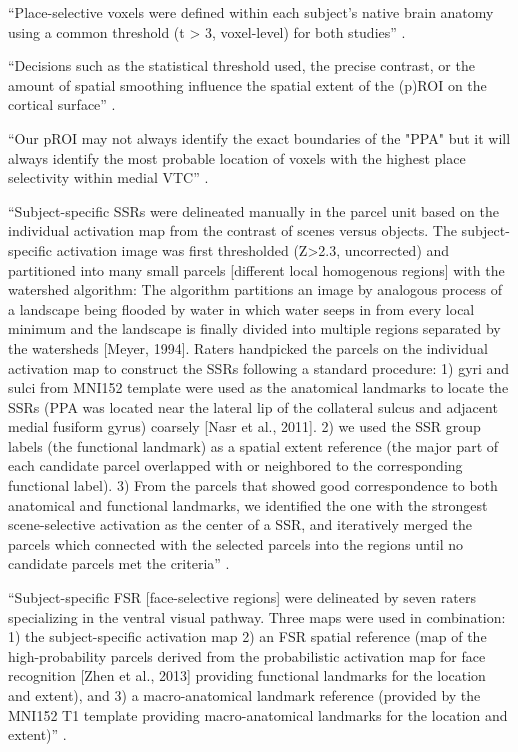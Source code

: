 ``Place-selective voxels were defined within each subject's native brain anatomy
using a common threshold (t > 3, voxel-level) for both studies''
\citep{weiner2018defining}.

``Decisions such as the statistical threshold used, the precise contrast, or the
amount of spatial smoothing influence the spatial extent of the (p)ROI on the
cortical surface'' \citep{weiner2018defining}.

``Our pROI may not always identify the exact boundaries of the "PPA" but it will
always identify the most probable location of voxels with the highest place
selectivity within medial VTC'' \citep{weiner2018defining}.



``Subject-specific SSRs were delineated manually in the parcel unit based on the
individual activation map from the contrast of scenes versus objects.
%
The subject-specific activation image was first thresholded (Z>2.3, uncorrected)
and partitioned into many small parcels [different local homogenous regions]
with the watershed algorithm:
%
The algorithm partitions an image by analogous process of a landscape being
flooded by water in which water seeps in from every local minimum and the
landscape is finally divided into multiple regions separated by the watersheds
[Meyer, 1994].
%
Raters handpicked the parcels on the individual activation map to construct the
SSRs following a standard procedure:
%
1) gyri and sulci from MNI152 template were used as the anatomical landmarks to
locate the SSRs (PPA was located near the lateral lip of the collateral sulcus
and adjacent medial fusiform gyrus) coarsely [Nasr et al., 2011].
%
2) we used the SSR group labels (the functional landmark) as a spatial extent
reference (the major part of each candidate parcel overlapped with or neighbored
to the corresponding functional label).
%
3) From the parcels that showed good correspondence to both anatomical and
functional landmarks, we identified the one with the strongest scene-selective
activation as the center of a SSR, and iteratively merged the parcels which
connected with the selected parcels into the regions until no candidate parcels
met the criteria'' \citet{zhen2017quantifying}.

``Subject-specific FSR [face-selective regions] were delineated by seven raters
specializing in the ventral visual pathway.
%
Three maps were used in combination:
%
1) the subject-specific activation map
%
2) an FSR spatial reference (map of the high-probability parcels derived from
the probabilistic activation map for face recognition [Zhen et al.,
2013] providing functional landmarks for the location and extent), and
%
3) a macro-anatomical landmark reference (provided by the MNI152 T1 template
providing macro-anatomical landmarks for the location and extent)''
\citet{zhen2015quantifying}.


